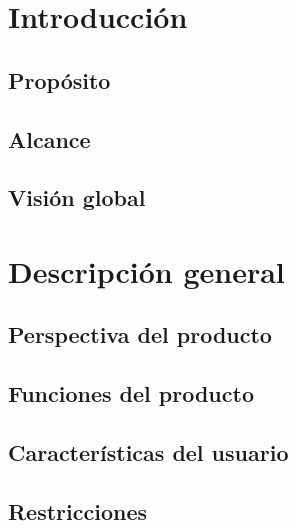 \section{Introducción}
\label{ch:intro}


\subsection{Propósito}


\subsection{Alcance}


% 

\subsection{Visión global}


\section{Descripción general}
\label{Descripción general}

\subsection{Perspectiva del producto}


\subsection{Funciones del producto}


\subsection{Características del usuario}


\subsection{Restricciones}


